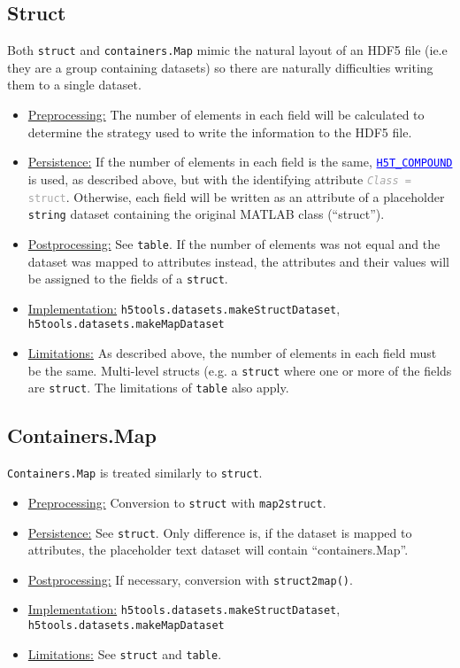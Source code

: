 \documentclass[11pt]{exam}
\newcommand\myurl[1]{\textcolor{blue}{\underline{#1}}}
\newcommand\myfcn[1]{\colorbox{codegray}{\textcolor{codeblue}{\texttt{#1}}}}
\newcommand\hdftype[1]{\texttt{\myurl{#1}}}
\newcommand\myatt[2]{\textcolor{darkgray}{\texttt{\textit{#1} = #2}}}
\begin{document}
        \subsection{Struct}
        \noindent Both \texttt{struct} and \texttt{containers.Map} mimic the natural layout of an HDF5 file (ie.e they are a group containing datasets) so there are naturally difficulties writing them to a single dataset. 
		\begin{itemize}
            \item \underline{Preprocessing:} The number of elements in each field will be calculated to determine the strategy used to write the information to the HDF5 file. 
            \item \underline{Persistence:} If the number of elements in each field is the same, \hdftype{H5T\_COMPOUND} is used, as described above, but with the identifying attribute \myatt{Class}{struct}. Otherwise, each field will be written as an attribute of a placeholder \texttt{string} dataset containing the original MATLAB class (``struct''). 
            \item \underline{Postprocessing:} See \texttt{table}. If the number of elements was not equal and the dataset was mapped to attributes instead, the attributes and their values will be assigned to the fields of a \texttt{struct}. 
            \item \underline{Implementation:} \myfcn{h5tools.datasets.makeStructDataset}, \myfcn{h5tools.datasets.makeMapDataset}
            \item \underline{Limitations:} As described above, the number of elements in each field must be the same. Multi-level structs (e.g. a \texttt{struct} where one or more of the fields are \texttt{struct}. The limitations of \texttt{table} also apply.
        \end{itemize}
	
        \subsection{Containers.Map}
        \noindent \texttt{Containers.Map} is treated similarly to \texttt{struct}.
        \noindent\begin{itemize}
            \item \underline{Preprocessing:} Conversion to \texttt{struct} with \myfcn{map2struct}.
            \item \underline{Persistence:} See \texttt{struct}. Only difference is, if the dataset is mapped to attributes, the placeholder text dataset will contain ``containers.Map''. 
            \item \underline{Postprocessing:} If necessary, conversion with \myfcn{struct2map()}. 
            \item \underline{Implementation:} \myfcn{h5tools.datasets.makeStructDataset}, \myfcn{h5tools.datasets.makeMapDataset}
            \item \underline{Limitations:} See \texttt{struct} and \texttt{table}.
        \end{itemize}
\end{document}
